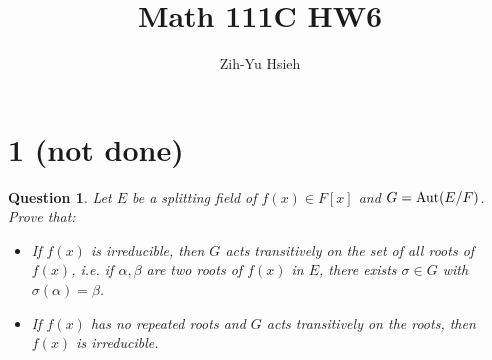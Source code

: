 \documentclass{article}
\title{Math 111C HW6}
\author{Zih-Yu Hsieh}
\newtheorem{question}{Question}
\begin{document}
\maketitle

\section*{1 (not done)}
\begin{myBox}[]{}
    \begin{question}
        Let $E$ be a splitting field of $f(x)\in F[x]$ and $G=\textmd{Aut}(E/F)$. Prove that:
        \begin{itemize}
            \item[(a)] If $f(x)$ is irreducible, then $G$ acts transitively on the set of all roots of $f(x)$, i.e. if $\alpha,\beta$ are two roots of $f(x)$ in $E$, there exists $\sigma\in G$ with $\sigma(\alpha)=\beta$.
            \item[(b)] If $f(x)$ has no repeated roots and $G$ acts transitively on the roots, then $f(x)$ is irreducible. 
        \end{itemize}
    \end{question}
\end{myBox}
\end{document}
